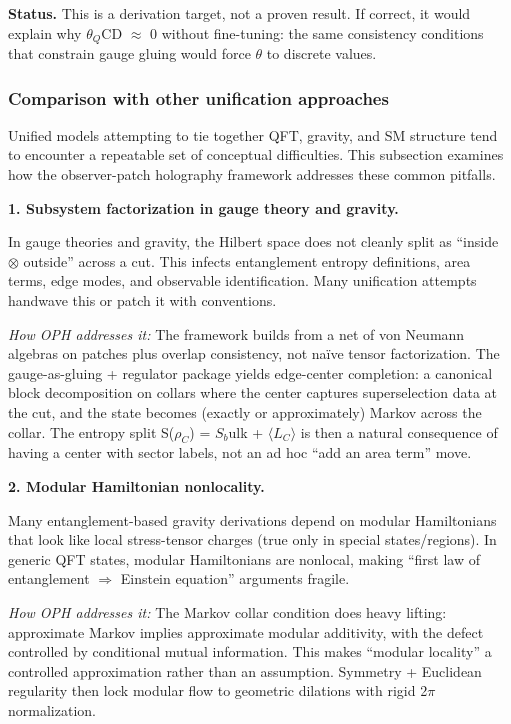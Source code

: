 \documentclass[11pt,a4paper]{article}
\theoremstyle{remark}
\begin{document}
\textbf{Status.} This is a derivation target, not a proven result. If correct, it
would explain why \(\ensuremath{\theta}_Q\)CD \ensuremath{\approx} 0 without fine-tuning: the same consistency
conditions that constrain gauge gluing would force \ensuremath{\theta} to discrete values.

\subsubsection{Comparison with other unification approaches}\label{comparison-with-other-unification-approaches}

Unified models attempting to tie together QFT, gravity, and SM structure tend to encounter a repeatable set of conceptual difficulties. This subsection examines how the observer-patch holography framework addresses these common pitfalls.

\textbf{1. Subsystem factorization in gauge theory and gravity.}

In gauge theories and gravity, the Hilbert space does not cleanly split as ``inside \ensuremath{\otimes} outside'' across a cut. This infects entanglement entropy definitions, area terms, edge modes, and observable identification. Many unification attempts handwave this or patch it with conventions.

\emph{How OPH addresses it:} The framework builds from a net of von Neumann algebras on patches plus overlap consistency, not naïve tensor factorization. The gauge-as-gluing + regulator package yields edge-center completion: a canonical block decomposition on collars where the center captures superselection data at the cut, and the state becomes (exactly or approximately) Markov across the collar. The entropy split S(\(\ensuremath{\rho}_C\)) = \(S_b\)ulk + \ensuremath{\langle}\(L_C\)\ensuremath{\rangle} is then a natural consequence of having a center with sector labels, not an ad hoc ``add an area term'' move.

\textbf{2. Modular Hamiltonian nonlocality.}

Many entanglement-based gravity derivations depend on modular Hamiltonians that look like local stress-tensor charges (true only in special states/regions). In generic QFT states, modular Hamiltonians are nonlocal, making ``first law of entanglement \ensuremath{\Rightarrow} Einstein equation'' arguments fragile.

\emph{How OPH addresses it:} The Markov collar condition does heavy lifting: approximate Markov implies approximate modular additivity, with the defect controlled by conditional mutual information. This makes ``modular locality'' a controlled approximation rather than an assumption. Symmetry + Euclidean regularity then lock modular flow to geometric dilations with rigid 2\ensuremath{\pi} normalization.
\end{document}

